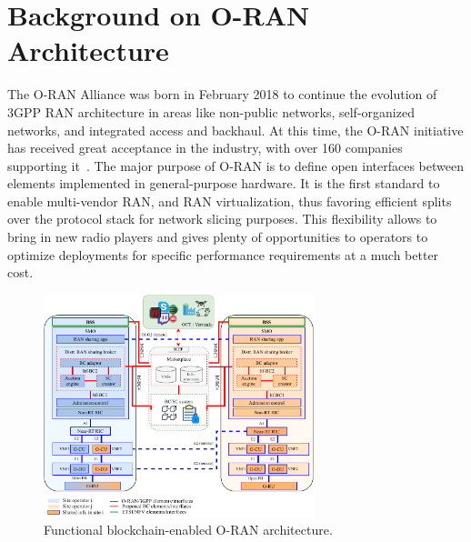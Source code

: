\documentclass[journal]{IEEEtran}
\begin{document}
	
	\section{Background on O-RAN Architecture}
	\label{section:oran}
	The O-RAN Alliance was born in February 2018 to continue the evolution of 3GPP RAN architecture in areas like non-public networks, self-organized networks, and integrated access and backhaul. At this time, the O-RAN initiative has received great acceptance in the industry, with over 160 companies supporting it~\cite{garcia2021ran}. The major purpose of O-RAN is to define open interfaces between elements implemented in general-purpose hardware. It is the first standard to enable multi-vendor RAN, and RAN virtualization, thus favoring efficient splits over the protocol stack for network slicing purposes. This flexibility allows to bring in new radio players and gives plenty of opportunities to operators to optimize deployments for specific performance requirements at a much better cost. 
	
	\begin{figure}[ht!]    
		\centering
		\includegraphics[width=0.7\textwidth]{functionalarchitecture3.pdf}
		\caption{Functional blockchain-enabled O-RAN architecture.}
		\label{fig:functionalarchitecture}
	\end{figure}
	
\end{document}
